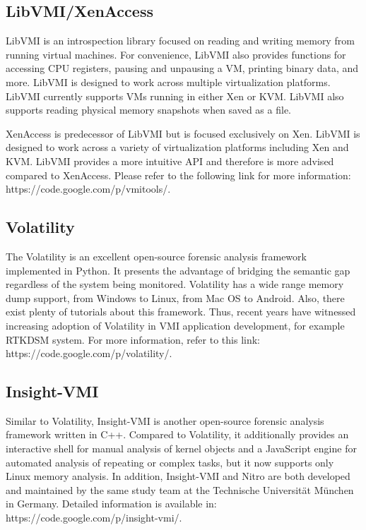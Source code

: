 \subsection{LibVMI/XenAccess  \cite{Reference10,Reference11}}

LibVMI is an introspection library focused on reading and writing memory from running virtual machines. For convenience, LibVMI also provides 
functions for accessing CPU registers, pausing and unpausing a VM, printing binary data, and more. LibVMI is designed to work across multiple 
virtualization platforms. LibVMI currently supports VMs running in either Xen or KVM. LibVMI also supports reading physical memory snapshots 
when saved as a file.

XenAccess is predecessor of LibVMI but is focused exclusively on Xen. LibVMI is designed to work across a variety of virtualization platforms
including Xen and KVM. LibVMI provides a more intuitive API and therefore is more advised compared to XenAccess. Please refer to the following
link for more information: https://code.google.com/p/vmitools/. 

\subsection{Volatility  \cite{Reference13}}

The Volatility is an excellent open-source forensic analysis framework implemented in Python. It presents the advantage of bridging the 
semantic gap regardless of the system being monitored. Volatility has a wide range memory dump support, from Windows to Linux, from Mac OS
to Android. Also, there exist plenty of tutorials about this framework. Thus, recent years have witnessed increasing adoption of Volatility
in VMI application development, for example RTKDSM system. For more information, refer to this link: https://code.google.com/p/volatility/.

\subsection{Insight-VMI  \cite{Reference14,Reference15}}

Similar to Volatility, Insight-VMI is another open-source forensic analysis framework written in C++. Compared to Volatility, it additionally
provides an interactive shell for manual analysis of kernel objects and a JavaScript engine for automated analysis of repeating or complex 
tasks, but it now supports only Linux memory analysis. In addition, Insight-VMI and Nitro are both developed and maintained by the same study
team at the Technische Universität München in Germany. Detailed information is available in: https://code.google.com/p/insight-vmi/.

